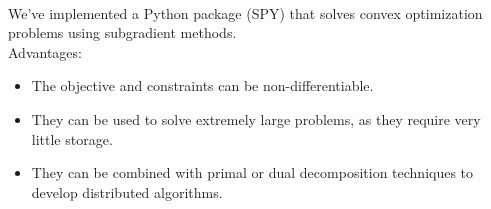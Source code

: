 \\
We've implemented a Python package (SPY) that solves convex
optimization problems using subgradient methods. 
\\
Advantages:

\begin{itemize}
\item The objective and constraints can be non-differentiable.
\item They can be used to solve extremely large problems, as they require
  very little storage.
\item They can be combined with primal or dual decomposition techniques to develop
  distributed algorithms.
\end{itemize}
